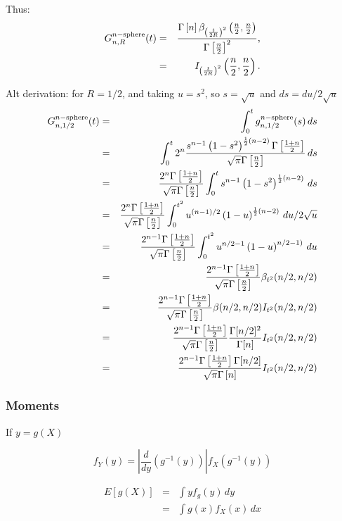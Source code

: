 Thus:
\begin{eqnarray}
G^{n-{\rm sphere}}_{n,R}(t)
    & = &\frac{\Gamma \left[n \right] {\beta}_{{\left(\frac{t}{2 R}\right)}^{2}}\left( \frac{n}{2},\frac{n}{2}\right)}
     {\Gamma\left[\frac{n}{2}\right]^{2}},  \nonumber \\   
     & = &  {I}_{{\left(\frac{t}{2 R}\right)}^{2}}\left( \frac{n}{2},\frac{n}{2}\right).
\end{eqnarray}




Alt derivation: for $R=1/2$, and taking $u=s^2$, so $s = \sqrt{u}$ and
$ds = du/2\sqrt{u}$
\begin{eqnarray}
G^{n-{\rm sphere}}_{n,1/2}(t)
    & = & \int_0^t g^{n-{\rm sphere}}_{n,1/2}(s) \, ds \nonumber \\
    & = & \int_0^t  2^n \frac{s^{n-1}
             \left(1 -s^2\right)^{\frac{1}{2} (n-2)}
             \Gamma\left[\frac{1+n}{2}\right]}{\sqrt{\pi }
             \Gamma\left[\frac{n}{2}\right]} 
             \, ds \nonumber \\    
    & = & \frac{ 2^n \Gamma\left[\frac{1+n}{2}\right]}{\sqrt{\pi}\Gamma\left[\frac{n}{2}\right]}
           \int_0^t s^{n-1}  \left(1 -s^2\right)^{\frac{1}{2} (n-2)}
             \, ds \nonumber \\    
    & = & \frac{ 2^n \Gamma\left[\frac{1+n}{2}\right]}{\sqrt{\pi}\Gamma\left[\frac{n}{2}\right]}
           \int_0^{t^2} u^{(n-1)/2}  \left(1 - u\right)^{\frac{1}{2} (n-2)}
             \, du/2\sqrt{u}  \nonumber \\    
    & = & \frac{ 2^{n-1} \Gamma\left[\frac{1+n}{2}\right]}{\sqrt{\pi}\Gamma\left[\frac{n}{2}\right]}
           \int_0^{t^2} u^{n/2-1}  \left(1 - u\right)^{n/2-1)}
             \, du  \nonumber \\    
    & = & \frac{ 2^{n-1} \Gamma\left[\frac{1+n}{2}\right]}{\sqrt{\pi}\Gamma\left[\frac{n}{2}\right]}
               \beta_{t^2}(n/2, n/2)  \nonumber \\    
    & = & \frac{ 2^{n-1} \Gamma\left[\frac{1+n}{2}\right]}{\sqrt{\pi}\Gamma\left[\frac{n}{2}\right]}
              \beta(n/2,n/2) I_{t^2}(n/2, n/2)  \nonumber \\    
    & = & \frac{ 2^{n-1} \Gamma\left[\frac{1+n}{2}\right]}{\sqrt{\pi}\Gamma\left[\frac{n}{2}\right]}
              \frac{\Gamma[n/2]^2}{\Gamma[n]} I_{t^2}(n/2, n/2)  \nonumber \\    
    & = & \frac{ 2^{n-1} \Gamma\left[\frac{1+n}{2}\right]\Gamma[n/2] }{\sqrt{\pi}\Gamma\left[n\right]}
              I_{t^2}(n/2, n/2)  \nonumber \\    
\end{eqnarray}




\subsubsection{Moments}


If $y = g(X)$

\[ f_Y(y) = \left| \frac{d}{dy} \left( g^{-1}(y) \right) \right|
               f_X\left( g^{-1}(y) \right)
\]


\begin{eqnarray}
 E[ g(X) ] & = & \int y f_g (y) \, dy \\
           & = & \int g(x) f_X(x) \, dx 
\end{eqnarray}

